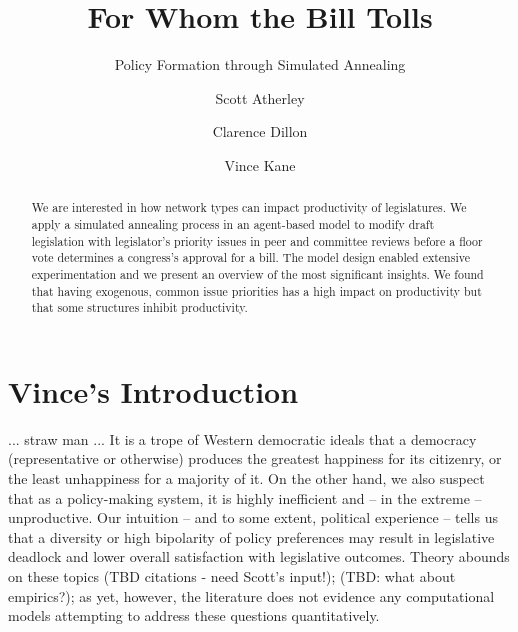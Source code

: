\documentclass[pdftex,12pt]{llncs}
\begin{document}
\title{For Whom the Bill Tolls}
\subtitle{Policy Formation through Simulated Annealing }
\author{Scott Atherley \and Clarence Dillon \and Vince Kane}
\maketitle

%
%

\begin{abstract}
 We are interested in how network types can impact productivity of legislatures. 
 We apply a simulated annealing process in an agent-based model to modify draft legislation with legislator's priority issues in peer and committee reviews before a floor vote determines a congress's approval for a bill.
 The model design enabled extensive experimentation and we present an overview of the most significant insights. We found that having exogenous, common issue priorities has a high impact on productivity but that some structures inhibit productivity.
\end{abstract}

\section{Vince's Introduction}
... straw man ...
It is a trope of Western democratic ideals that a democracy (representative or otherwise) produces the greatest happiness for its citizenry, or the least unhappiness for a majority of it.
On the other hand, we also suspect that as a policy-making system, it is highly inefficient and -- in the extreme -- unproductive.
Our intuition -- and to some extent, political experience -- tells us that a diversity or high bipolarity of policy preferences may result in legislative deadlock and lower overall satisfaction with legislative outcomes.
Theory abounds on these topics (TBD citations - need Scott's input!); (TBD: what about empirics?); as yet, however, the literature does not evidence any computational models attempting to address these questions quantitatively.
\end{document}
